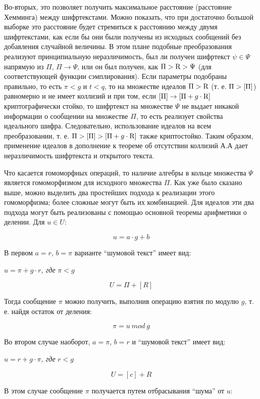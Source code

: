     Во-вторых, это позволяет получить максимальное расстояние (расстояние Хемминга) между шифртекстами. Можно показать, что при достаточно большой выборке это расстояние будет стремиться к расстоянию между двумя шифртекстами, как если бы они были получены из исходных сообщений без добавления случайной величины. В этом плане подобные преобразования реализуют принципиальную неразличимость, был ли получен шифртекст $\psi \in \Psi $ напрямую из $\Pi $, $\Pi \to \Psi $, или он был получен, как $\Pi >{\textrm R}>\Psi $ (для соответствующей функции сэмплирования). Если параметры подобраны правильно, то есть $\pi <g$ и $t<q$, то на множестве идеалов $\Pi >{\textrm R}$ (т. е. $\Pi >{\textrm [}\Pi {\textrm ]}$) равномерно и не имеет коллизий и при том, если $\left[\Pi\right]\to [\Pi +g\cdot {\textrm R}]$ криптографически стойко, то шифртекст на множестве $\Psi $ не выдает никакой информации о сообщении на множестве $\Pi $, то есть реализует свойства идеального шифра. Следовательно, использование идеалов на всем преобразовании, т. е. $\Pi >\left[\Pi \right]>{\textrm [}\Pi +g\cdot {\textrm R}]$ также криптостойко. Таким образом, применение идеалов в дополнение к теореме об отсутствии коллизий А.А дает неразличимость шифртекста и открытого текста.
    
    Что касается гомоморфных операций, то наличие алгебры в кольце множества $\Psi $ является гомоморфизмом для исходного множества $\Pi $. Как уже было сказано выше, можно выделить два простейших подхода к реализации этого гомоморфизма; более сложные могут быть их комбинацией. Для идеалов эти два подхода могут быть реализованы с помощью основной теоремы арифметики о делении. Для $u\in U$: 
    
    \[u=a\cdot g+b\] 
    
    В первом $a=r$, $b=\pi $ варианте ``шумовой текст'' имеет вид:
    
    $u=\pi +g\cdot r$\textit{, где }$\pi <g$\textit{}
    
    \[U=\Pi +[R]\] 
    
    Тогда сообщение  $\pi $ можно получить, выполнив операцию взятия по модулю $g$, т. е. найдя остаток от деления:
    
    \[\pi =u\ mod\ g\] 
    
    Во втором случае наоборот, $a=\pi $, $b=r$ и ``шумовой текст'' имеет вид:
    
    $u=r+g\cdot \pi $\textit{, где }$r<g$\textit{}
    
    \[U=[c]+R\] 
    
    В этом случае сообщение $\pi $ получается путем отбрасывания ``шума'' от $u$:
    
